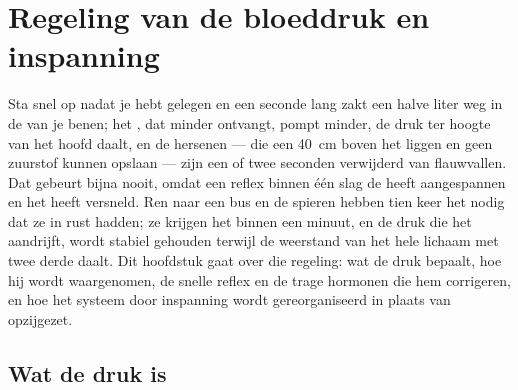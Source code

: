 \chapter{Regeling van de bloeddruk en inspanning}\label{ch:b2:blood-pressure}

Sta snel op nadat je hebt gelegen en een seconde lang zakt een halve liter
 weg in de  van je benen; het , dat minder ontvangt, pompt
minder, de druk ter hoogte van het hoofd daalt, en de hersenen --- die een
\qty{40}{cm} boven het  liggen en geen zuurstof kunnen opslaan --- zijn een of
twee seconden verwijderd van flauwvallen. Dat gebeurt bijna nooit, omdat een
reflex binnen één slag de  heeft aangespannen en het  heeft
versneld. Ren naar een bus en de spieren hebben tien keer het  nodig dat
ze in rust hadden; ze krijgen het binnen een minuut, en de druk die het
aandrijft, wordt stabiel gehouden terwijl de weerstand van het hele lichaam
met twee derde daalt. Dit hoofdstuk gaat over die regeling: wat de druk
bepaalt, hoe hij wordt waargenomen, de snelle reflex en de trage hormonen
die hem corrigeren, en hoe het systeem door inspanning wordt gereorganiseerd
in plaats van opzijgezet.

\section{Wat de druk is}

